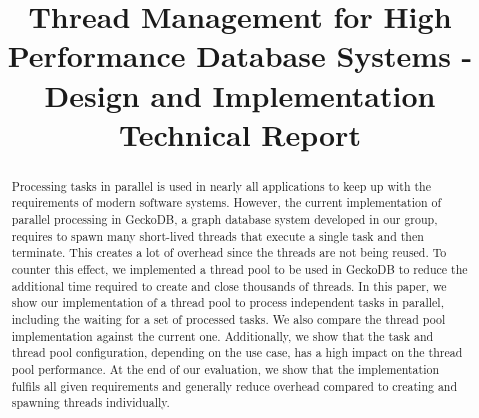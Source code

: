 \documentclass[conference]{IEEEtran}
\begin{document}



\title{Thread Management for High Performance Database Systems - Design and Implementation \\{\large Technical Report}\\}

\author{
	 \and
}

\maketitle

\begin{abstract}
        Processing tasks in parallel is used in nearly all applications to keep
        up with the requirements of modern software systems. However, the
        current implementation of parallel processing in GeckoDB, a graph database system developed in our group, requires
        to spawn many short-lived threads that execute a single task and then
        terminate. This creates a lot of overhead since the threads are not
        being reused. To counter this effect, we implemented a thread pool to be
        used in GeckoDB to reduce the additional time required
        to create and close thousands of threads. In this paper, we show our
        implementation of a thread pool to process independent tasks in parallel,
        including the waiting for a set of processed tasks. We also compare the
        thread pool implementation against the current one. Additionally, we show that the task and thread pool configuration,
        depending on the use case, has a high impact on the thread
        pool performance. At the end of our evaluation, we show that the implementation 
        fulfils all given requirements and generally reduce
        overhead compared to creating and spawning threads individually.
\end{abstract}
\end{document}
